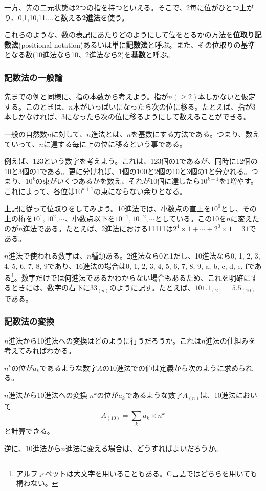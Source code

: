 一方、先の二元状態は2つの指を持つといえる。そこで、2毎に位がひとつ上がり、0,1,10,11,...と数える\textbf{2進法}を使う。

これらのような、数の表記にあたりどのようにして位をとるかの方法を\textbf{位取り記数法}(positional notation)あるいは単に\textbf{記数法}と呼ぶ。また、その位取りの基準となる数(10進法なら10、2進法なら2)を\textbf{基数}と呼ぶ。

\subsubsection{記数法の一般論}
先までの例と同様に、指の本数から考えよう。指が$n(\ge2)$本しかないと仮定する。このときは、$n$本がいっぱいになったら次の位に移る。たとえば、指が3本しかなければ、3になったら次の位に移るようにして数えることができる。

一般の自然数$n$に対して、$n$進法とは、$n$を基数にする方法である。つまり、数えていって、$n$に達する毎に上の位に移るという事である。

例えば、123という数字を考えよう。これは、123個の1であるが、同時に12個の10と3個の1である。更に分ければ、1個の100と2個の10と3個の1と分かれる。つまり、$10^k$の束がいくつあるかを数え、それが10個に達したら$10^{k+1}$を1増やす。これによって、各位は$10^{k+1}$の束にならない余りとなる。

上記に従って位取りをしてみよう。10進法では、小数点の直上を$10^0$とし、その上の桁を$10^1,10^2,\cdots$、小数点以下を$10^{-1},10^{-2},\cdots$としている。この10を$n$に変えたのが$n$進法である。たとえば、2進法における11111は$2^4\times1+\cdots+2^0\times1=31$である。

$n$進法で使われる数字は、$n$種類ある。2進法なら0と1だし、10進法なら0, 1, 2, 3, 4, 5, 6, 7, 8, 9であり、16進法の場合は0, 1, 2, 3, 4, 5, 6, 7, 8, 9, a, b, c, d, e, fである\footnote{アルファベットは大文字を用いることもある。C言語ではどちらを用いても構わない。}。数字だけでは何進法であるかわからない場合もあるため、これを明確にするときには、数字の右下に$33_{(n)}$のように記す。たとえば、$101.1_{(2)}=5.5_{(10)}$である。

\subsubsection{記数法の変換}
$n$進法から10進法への変換はどのように行うだろうか。これは$n$進法の仕組みを考えてみればわかる。

$n^k$の位が$a_k$であるような数字$A$の10進法での値は定義から次のように求められる。
\begin{itembox}[l]{$n$進法から10進法への変換}
$n^k$の位が$a_k$であるような数字$A_{(n)}$は、10進法において
\begin{equation*}
A_{(10)}=\sum_{k}a_k\times n^k
\end{equation*}
と計算できる。
\end{itembox}
逆に、10進法から$n$進法に変える場合は、どうすればよいだろうか。

